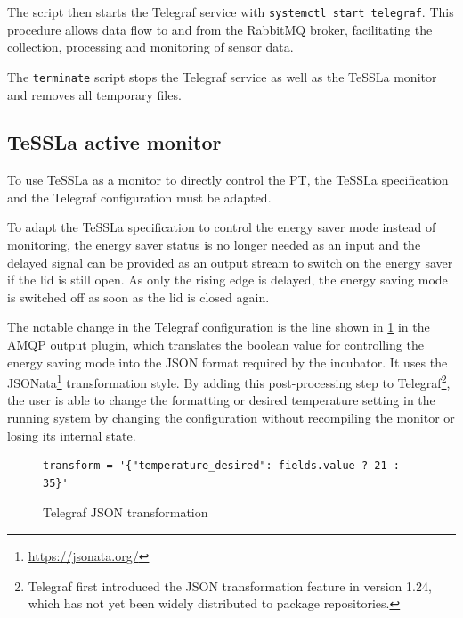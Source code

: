 %
The script then starts the Telegraf service with \lstinline{systemctl start telegraf}. This procedure allows data flow to and from the RabbitMQ broker, facilitating the collection, processing and monitoring of sensor data.

The \texttt{terminate} script stops the Telegraf service as well as the TeSSLa monitor and removes all temporary files.

\subsection{TeSSLa active monitor}\label{subsec:TESLA2}
To use TeSSLa as a monitor to directly control the PT, the TeSSLa specification and the Telegraf configuration must be adapted.

To adapt the TeSSLa specification to control the energy saver mode instead of monitoring, the energy saver status is no longer needed as an input and the delayed signal can be provided as an output stream to switch on the energy saver if the lid is still open. As only the rising edge is delayed, the energy saving mode is switched off as soon as the lid is closed again.

The notable change in the Telegraf configuration is the line shown in \cref{fig:telegraf_json_transformation} in the AMQP output plugin, which translates the boolean value for controlling the energy saving mode into the JSON format required by the incubator. It uses the JSONata\footnote{\url{https://jsonata.org/}} transformation style.
By adding this post-processing step to Telegraf\footnote{
	Telegraf first introduced the JSON transformation feature in version 1.24, which has not yet been widely distributed to package repositories.
}, the user is able to change the formatting or desired temperature setting in the running system by changing the configuration without recompiling the monitor or losing its internal state.%
%
\begin{figure}[H]
	\begin{lstlisting}
transform = '{"temperature_desired": fields.value ? 21 : 35}'
    \end{lstlisting}
	\caption{Telegraf JSON transformation}
	\label{fig:telegraf_json_transformation}
\end{figure}















